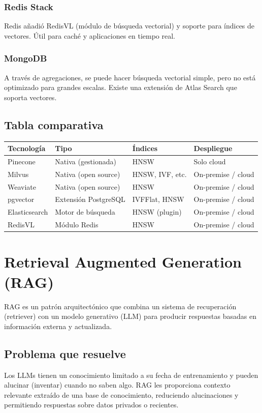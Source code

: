\documentclass[12pt,a4paper,openany,oneside]{book}
\begin{document}
\subsection{Redis Stack}
Redis añadió RedisVL (módulo de búsqueda vectorial) y soporte para índices de vectores. Útil para caché y aplicaciones en tiempo real.

\subsection{MongoDB}
A través de agregaciones, se puede hacer búsqueda vectorial simple, pero no está optimizado para grandes escalas. Existe una extensión de Atlas Search que soporta vectores.

\section{Tabla comparativa}
\begin{center}
\begin{tabular}{|l|l|l|l|}
\hline
\textbf{Tecnología} & \textbf{Tipo} & \textbf{Índices} & \textbf{Despliegue} \\ \hline
Pinecone & Nativa (gestionada) & HNSW & Solo cloud \\
Milvus & Nativa (open source) & HNSW, IVF, etc. & On-premise / cloud \\
Weaviate & Nativa (open source) & HNSW & On-premise / cloud \\
pgvector & Extensión PostgreSQL & IVFFlat, HNSW & On-premise / cloud \\
Elasticsearch & Motor de búsqueda & HNSW (plugin) & On-premise / cloud \\
RedisVL & Módulo Redis & HNSW & On-premise / cloud \\ \hline
\end{tabular}
\end{center}

\chapter{Retrieval Augmented Generation (RAG)}
RAG es un patrón arquitectónico que combina un sistema de recuperación (retriever) con un modelo generativo (LLM) para producir respuestas basadas en información externa y actualizada.

\section{Problema que resuelve}
Los LLMs tienen un conocimiento limitado a su fecha de entrenamiento y pueden alucinar (inventar) cuando no saben algo. RAG les proporciona contexto relevante extraído de una base de conocimiento, reduciendo alucinaciones y permitiendo respuestas sobre datos privados o recientes.
\end{document}
